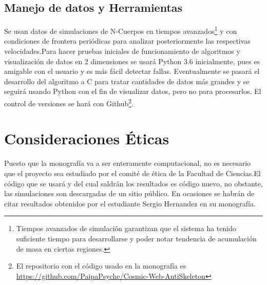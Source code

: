 \documentclass[12pt]{article}
\begin{document}
\subsection{Manejo de datos y Herramientas}
Se usan datos de simulaciones de N-Cuerpos \cite{simulations} en tiempos avanzados\footnote{Tiempos avanzados de simulación garantizan que el sistema ha tenido suficiente tiempo para desarrollarse y poder notar tendencia de acumulación de masa en ciertas regiones.} y con condiciones de frontera periódicas para analizar posteriormente las respectivas velocidades.Para hacer pruebas iniciales de funcionamiento de algoritmos y visualización de datos en 2 dimensiones se usará Python 3.6 inicialmente, pues es amigable con el usuario y es más fácil detectar fallas. Eventualmente se pasará el desarrollo del algoritmo a C para tratar cantidades de datos más grandes y se seguirá usando Python con el fin de visualizar datos, pero no para procesarlos. El control de versiones se hará con Github\footnote{El repositorio con el código usado en la monografía es \url{https://github.com/PaipaPsyche/Cosmic-Web-AntiSkeleton}}.\\




\section{Consideraciones \'Eticas}

Puesto que la monografía va a ser enteramente computacional, no es necesario que el proyecto sea estudiado por el comité de ética de la Facultad de Ciencias.El código que se usará y del cual saldrán los resultados es código nuevo, no obstante, las simulaciones son descargadas de un sitio público\cite{simulations}. En ocasiones se habrán de citar resultados obtenidos por el estudiante Sergio Hernandez en su monografía\cite{Hernandez}.

\end{document}
